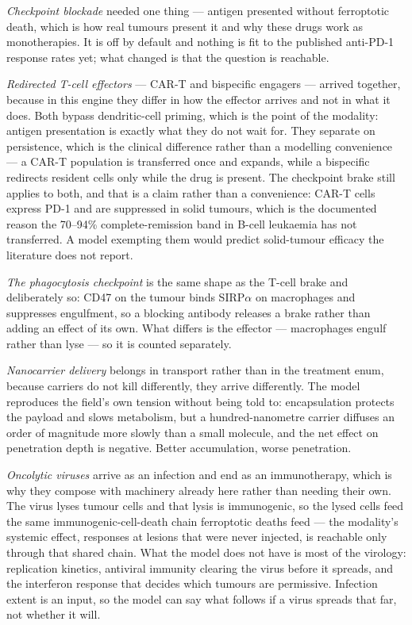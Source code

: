 \documentclass[11pt,twoside,openright]{report}
\begin{document}
\textit{Checkpoint blockade} needed one thing --- antigen presented without ferroptotic death, which is how real tumours present it and why these drugs work as monotherapies. It is off by default and nothing is fit to the published anti-PD-1 response rates yet; what changed is that the question is reachable.

\textit{Redirected T-cell effectors} --- CAR-T and bispecific engagers --- arrived together, because in this engine they differ in how the effector arrives and not in what it does. Both bypass dendritic-cell priming, which is the point of the modality: antigen presentation is exactly what they do not wait for. They separate on persistence, which is the clinical difference rather than a modelling convenience --- a CAR-T population is transferred once and expands, while a bispecific redirects resident cells only while the drug is present. The checkpoint brake still applies to both, and that is a claim rather than a convenience: CAR-T cells express PD-1 and are suppressed in solid tumours, which is the documented reason the 70–94\% complete-remission band in B-cell leukaemia has not transferred. A model exempting them would predict solid-tumour efficacy the literature does not report.

\textit{The phagocytosis checkpoint} is the same shape as the T-cell brake and deliberately so: CD47 on the tumour binds SIRP$\alpha$ on macrophages and suppresses engulfment, so a blocking antibody releases a brake rather than adding an effect of its own. What differs is the effector --- macrophages engulf rather than lyse --- so it is counted separately.

\textit{Nanocarrier delivery} belongs in transport rather than in the treatment enum, because carriers do not kill differently, they arrive differently. The model reproduces the field's own tension without being told to: encapsulation protects the payload and slows metabolism, but a hundred-nanometre carrier diffuses an order of magnitude more slowly than a small molecule, and the net effect on penetration depth is negative. Better accumulation, worse penetration.

\textit{Oncolytic viruses} arrive as an infection and end as an immunotherapy, which is why they compose with machinery already here rather than needing their own. The virus lyses tumour cells and that lysis is immunogenic, so the lysed cells feed the same immunogenic-cell-death chain ferroptotic deaths feed --- the modality's systemic effect, responses at lesions that were never injected, is reachable only through that shared chain. What the model does not have is most of the virology: replication kinetics, antiviral immunity clearing the virus before it spreads, and the interferon response that decides which tumours are permissive. Infection extent is an input, so the model can say what follows if a virus spreads that far, not whether it will.
\end{document}
